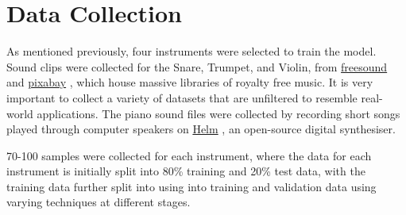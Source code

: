 \documentclass[class=report,11pt,crop=false]{standalone}
\begin{document}
\ifstandalone
\tableofcontents
\fi
\section{Data Collection \label{ch: data_collection}}

As mentioned previously, four instruments were selected to train the model. Sound clips were collected for the Snare, Trumpet, and Violin, from \href{https://freesound.org/}{freesound} \cite{freesound} and \href{https://pixabay.com/}{pixabay} \cite{pixabay}, which house massive libraries of royalty free music. It is very important to collect a variety of datasets that are unfiltered to resemble real-world applications. The piano sound files were collected by recording short songs played through computer speakers on \href{https://tytel.org/helm/}{Helm} \cite{tytel2018Helm}, an open-source digital synthesiser.

70-100 samples were collected for each instrument, where the data for each instrument is initially split into 80\% training and 20\% test data, with the training data further split into using into training and validation data using varying techniques at different stages.

\ifstandalone

\printnoidxglossary[type=\acronymtype,nonumberlist]
\fi
\end{document}

